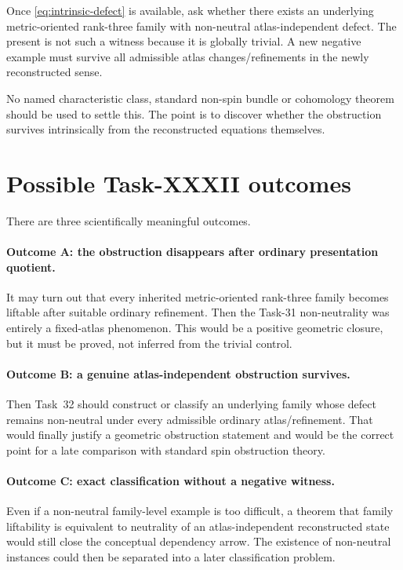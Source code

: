 \documentclass[11pt,a4paper]{article}
\theoremstyle{definition}
\newcommand{\code}[1]{\path{#1}}
\begin{document}
Once \cref{eq:intrinsic-defect} is available, ask whether there exists an underlying metric-oriented rank-three family with non-neutral atlas-independent defect.  The present \code{badFamily} is not such a witness because it is globally trivial.  A new negative example must survive all admissible atlas changes/refinements in the newly reconstructed sense.

No named characteristic class, standard non-spin bundle or cohomology theorem should be used to settle this.  The point is to discover whether the obstruction survives intrinsically from the reconstructed equations themselves.

\section{Possible Task-XXXII outcomes}\label{sec:outcomes}

There are three scientifically meaningful outcomes.

\paragraph{Outcome A: the obstruction disappears after ordinary presentation quotient.}
It may turn out that every inherited metric-oriented rank-three family becomes liftable after suitable ordinary refinement.  Then the Task-31 non-neutrality was entirely a fixed-atlas phenomenon.  This would be a positive geometric closure, but it must be proved, not inferred from the trivial control.

\paragraph{Outcome B: a genuine atlas-independent obstruction survives.}
Then Task~32 should construct or classify an underlying family whose defect remains non-neutral under every admissible ordinary atlas/refinement.  That would finally justify a geometric obstruction statement and would be the correct point for a late comparison with standard spin obstruction theory.

\paragraph{Outcome C: exact classification without a negative witness.}
Even if a non-neutral family-level example is too difficult, a theorem that family liftability is equivalent to neutrality of an atlas-independent reconstructed state would still close the conceptual dependency arrow.  The existence of non-neutral instances could then be separated into a later classification problem.
\end{document}
